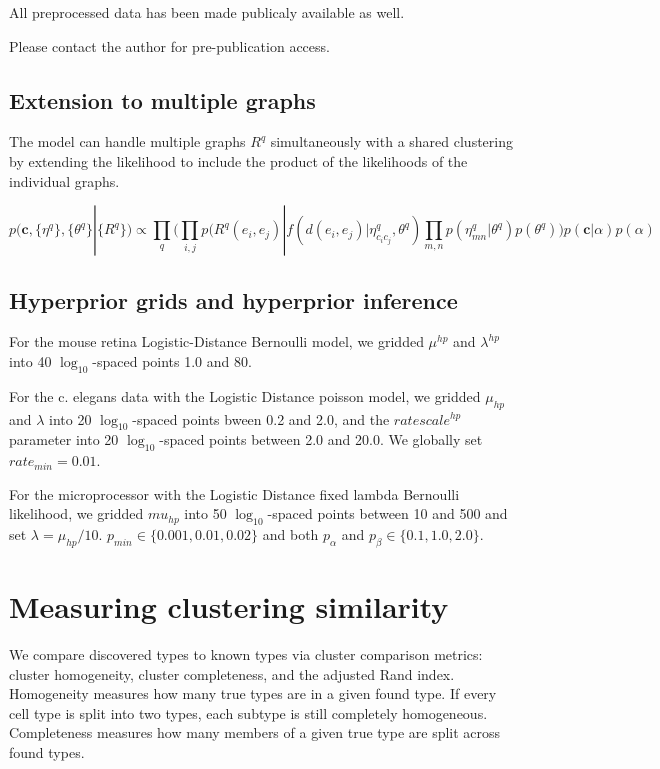 \documentclass{article}
\renewcommand{\vec}[1]{\mathbf{#1}}
\begin{document}
All preprocessed data has been made publicaly available as well. 

Please contact the author for pre-publication access. 

\subsection*{Extension to multiple graphs}
\label{supp:multigraph}
The model can handle multiple graphs $R^q$ simultaneously with a shared clustering by extending the likelihood to include the product of the likelihoods of the individual graphs. 

\begin{equation}
  p(\vec{c}, \{\eta^q\}, \{\theta^q\} | \{R^q\} ) \propto \prod_q \Bigg(\prod_{i, j} p(R^q(e_i, e_j) | f(d(e_i, e_j) | \eta^q_{c_ic_j}, \theta^q) \prod_{m, n} p(\eta^q_{mn} | \theta^q)  p(\theta^q) \Bigg) p(\vec{c} | \alpha) p(\alpha) 
\end{equation}

\FloatBarrier
\subsection*{Hyperprior grids and hyperprior inference}
\label{supp:hyperpriors}

For the mouse retina Logistic-Distance Bernoulli model, we gridded
$\mu^{hp}$ and $\lambda^{hp}$ into 40 $\log_{10}$-spaced points 1.0
and 80. 

For the c. elegans data with the Logistic Distance poisson model, we
gridded $\mu_{hp}$ and $\lambda$ into 20 $\log_{10}$-spaced points
bween 0.2 and 2.0, and the $ratescale^{hp}$ parameter into 20
$\log_{10}$-spaced points between 2.0 and 20.0. We globally set
$rate_{min}=0.01$.

For the microprocessor with the Logistic Distance fixed lambda
Bernoulli likelihood, we gridded $mu_{hp}$ into 50 $\log_{10}$-spaced
points between 10 and 500 and set $\lambda=\mu_{hp}/10$. $p_{min} \in
\{0.001, 0.01, 0.02\}$ and both $p_\alpha$ and $p_\beta \in \{0.1,
1.0, 2.0\}$.

\section*{Measuring clustering similarity}
We compare discovered types to known types via cluster comparison
metrics: cluster homogeneity, cluster completeness, and the adjusted
Rand index. Homogeneity measures how many true types are in a given
found type. If every cell type is split into two types, each subtype
is still completely homogeneous. Completeness measures how many
members of a given true type are split across found types.
\end{document}
